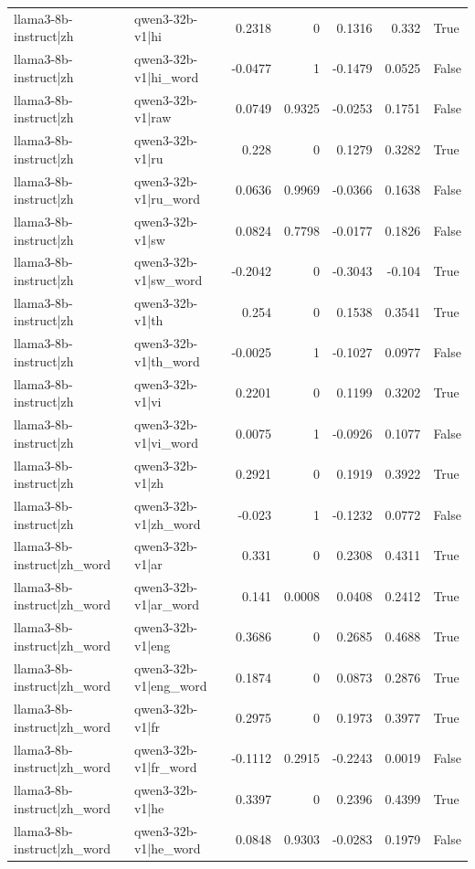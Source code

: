 \begin{table}
\begin{tabular}{l l r r r r l}
llama3-8b-instruct|zh & qwen3-32b-v1|hi & 0.2318 & 0 & 0.1316 & 0.332 & True \\
llama3-8b-instruct|zh & qwen3-32b-v1|hi_word & -0.0477 & 1 & -0.1479 & 0.0525 & False \\
llama3-8b-instruct|zh & qwen3-32b-v1|raw & 0.0749 & 0.9325 & -0.0253 & 0.1751 & False \\
llama3-8b-instruct|zh & qwen3-32b-v1|ru & 0.228 & 0 & 0.1279 & 0.3282 & True \\
llama3-8b-instruct|zh & qwen3-32b-v1|ru_word & 0.0636 & 0.9969 & -0.0366 & 0.1638 & False \\
llama3-8b-instruct|zh & qwen3-32b-v1|sw & 0.0824 & 0.7798 & -0.0177 & 0.1826 & False \\
llama3-8b-instruct|zh & qwen3-32b-v1|sw_word & -0.2042 & 0 & -0.3043 & -0.104 & True \\
llama3-8b-instruct|zh & qwen3-32b-v1|th & 0.254 & 0 & 0.1538 & 0.3541 & True \\
llama3-8b-instruct|zh & qwen3-32b-v1|th_word & -0.0025 & 1 & -0.1027 & 0.0977 & False \\
llama3-8b-instruct|zh & qwen3-32b-v1|vi & 0.2201 & 0 & 0.1199 & 0.3202 & True \\
llama3-8b-instruct|zh & qwen3-32b-v1|vi_word & 0.0075 & 1 & -0.0926 & 0.1077 & False \\
llama3-8b-instruct|zh & qwen3-32b-v1|zh & 0.2921 & 0 & 0.1919 & 0.3922 & True \\
llama3-8b-instruct|zh & qwen3-32b-v1|zh_word & -0.023 & 1 & -0.1232 & 0.0772 & False \\
llama3-8b-instruct|zh_word & qwen3-32b-v1|ar & 0.331 & 0 & 0.2308 & 0.4311 & True \\
llama3-8b-instruct|zh_word & qwen3-32b-v1|ar_word & 0.141 & 0.0008 & 0.0408 & 0.2412 & True \\
llama3-8b-instruct|zh_word & qwen3-32b-v1|eng & 0.3686 & 0 & 0.2685 & 0.4688 & True \\
llama3-8b-instruct|zh_word & qwen3-32b-v1|eng_word & 0.1874 & 0 & 0.0873 & 0.2876 & True \\
llama3-8b-instruct|zh_word & qwen3-32b-v1|fr & 0.2975 & 0 & 0.1973 & 0.3977 & True \\
llama3-8b-instruct|zh_word & qwen3-32b-v1|fr_word & -0.1112 & 0.2915 & -0.2243 & 0.0019 & False \\
llama3-8b-instruct|zh_word & qwen3-32b-v1|he & 0.3397 & 0 & 0.2396 & 0.4399 & True \\
llama3-8b-instruct|zh_word & qwen3-32b-v1|he_word & 0.0848 & 0.9303 & -0.0283 & 0.1979 & False \\

\end{tabular}
\end{table}
